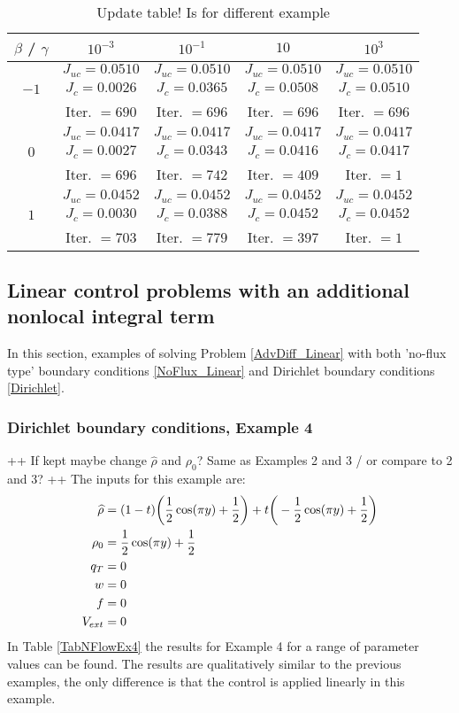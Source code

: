 \begin{table}
	\begin{tabular}{ ||c|| c | c |c | c ||}
		\hline
		$\beta$ / $\gamma$ & $10^{-3}$  & $10^{-1}$  & $10$ & $10^3$ \\ 
		\hline 
		& $J_{uc} = 0.0510$ & $J_{uc} = 0.0510$  & $J_{uc} = 0.0510$ & $J_{uc} = 0.0510$\\ 
		$-1$ & $J_c = 0.0026$ & $J_c = 0.0365$ & $J_c = 0.0508$ & $J_c = 0.0510$\\ 
		& Iter. $= 690$ & Iter. $= 696$  & Iter. $= 696$ & Iter. $= 696$\\ 
		\hline
		& $J_{uc} = 0.0417$ & $J_{uc} = 0.0417$  & $J_{uc} = 0.0417$& $J_{uc} = 0.0417$\\
		$0$  & $J_c = 0.0027$ & $J_c = 0.0343$  & $J_c = 0.0416$ & $J_c = 0.0417$\\ 
		& Iter. $= 696$ & Iter. $= 742$  & Iter. $= 409$ & Iter. $= 1$\\ 
		\hline
		& $J_{uc} = 0.0452$ & $J_{uc} = 0.0452$  & $J_{uc} = 0.0452$ & $J_{uc} = 0.0452$\\
		$1$  & $J_c = 0.0030$ & $J_c = 0.0388$  & $J_c = 0.0452$ & $J_c = 0.0452$\\ 
		& Iter. $= 703$ & Iter. $= 779$  & Iter. $= 397$ & Iter. $= 1$\\ 
		\hline 
	\end{tabular}
	\caption{Update table! Is for different example}
	\label{TabNFlowEx3}
\end{table}


\subsection{Linear control problems with an additional nonlocal integral term}
In this section, examples of solving Problem \eqref{AdvDiff_Linear} with both 'no-flux type' boundary conditions \eqref{NoFlux_Linear} and Dirichlet boundary conditions \eqref{Dirichlet}.
\subsubsection{Dirichlet boundary conditions, Example 4}
++ If kept maybe change $\widehat \rho$ and $\rho_0$? Same as Examples 2 and 3 / or compare to 2 and 3? ++
The inputs for this example are:
\begin{align*}
\widehat \rho &= (1 - t)\bigg(\frac{1}{2}\cos(\pi y) + \frac{1}{2}\bigg)  + t\bigg(-\frac{1}{2}\cos(\pi y) + \frac{1}{2}\bigg)\\
\rho_{0} &= \frac{1}{2}\cos(\pi y) + \frac{1}{2}\\
q_{T} &= 0\\
{w} &= 0\\
f &=0\\
V_{ext} &=0
\end{align*}
In Table \ref{TabNFlowEx4} the results for Example 4 for a range of parameter values can be found. The results are qualitatively similar to the previous examples, the only difference is that the control is applied linearly in this example.

